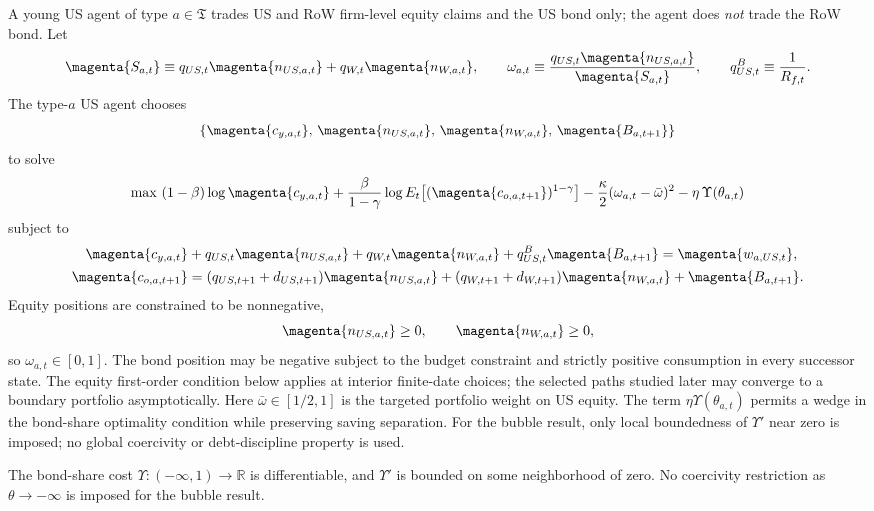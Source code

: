 \documentclass{article}
\def\green#1{#1}%
\begin{document}
A young US agent of type $a\in\mathfrak T$ trades US and RoW firm-level equity claims and the US bond only; the agent does \emph{not} trade the RoW bond. Let
\[
\magenta{S_{a,t}}\equiv q_{US,t}\magenta{n_{US,a,t}}+q_{W,t}\magenta{n_{W,a,t}},
\qquad
\omega_{a,t}\equiv\frac{q_{US,t}\magenta{n_{US,a,t}}}{\magenta{S_{a,t}}},
\qquad
q^B_{US,t}\equiv \frac{1}{R_{f,t}}.
\]
The type-$a$ US agent chooses
\[
\{\magenta{c_{y,a,t}},\,\magenta{n_{US,a,t}},\,\magenta{n_{W,a,t}},\,\magenta{B_{a,t+1}}\}
\]
to solve
\[
\max
\ (1-\beta)\log \magenta{c_{y,a,t}}
+\frac{\beta}{1-\gamma}\log E_t\!\left[(\magenta{c_{o,a,t+1}})^{1-\gamma}\right]
-\frac{\kappa}{2}(\omega_{a,t}-\bar\omega)^2
-\eta\,\Upsilon(\theta_{a,t})
\]
subject to
\begin{align*}
\magenta{c_{y,a,t}}
&+q_{US,t}\magenta{n_{US,a,t}}+q_{W,t}\magenta{n_{W,a,t}}
+q^B_{US,t}\magenta{B_{a,t+1}}
= \magenta{w_{a,US,t}},\\
\magenta{c_{o,a,t+1}}
&=
(q_{US,t+1}+d_{US,t+1})\magenta{n_{US,a,t}}
+(q_{W,t+1}+d_{W,t+1})\magenta{n_{W,a,t}}
+\magenta{B_{a,t+1}}.
\end{align*}
Equity positions are constrained to be nonnegative,
\[
\magenta{n_{US,a,t}}\ge0,
\qquad
\magenta{n_{W,a,t}}\ge0,
\]
so $\omega_{a,t}\in[0,1]$.  The bond position may be negative subject to the budget constraint and strictly positive consumption in every successor state.  The equity first-order condition below applies at interior finite-date choices; the selected paths studied later may converge to a boundary portfolio asymptotically.
Here $\bar\omega\in[1/2,1]$ is the targeted portfolio weight on US equity. The term $\eta\Upsilon(\theta_{a,t})$ \green{permits} a \green{wedge} in the \green{bond-share optimality condition while preserving} saving separation. \green{For the bubble result}, \green{only local boundedness of} $\Upsilon'$ \green{near zero is imposed}; \green{no global coercivity or debt-discipline property is used}.

\begin{ass}[Primitive \green{bond-cost regularity}]\label{ass_issuance_costs}
The \green{bond-share cost} $\Upsilon:(-\infty,1)\to\mathbb R$ is \green{differentiable}, and $\Upsilon'$ \green{is bounded on some neighborhood of zero}.  \green{No coercivity restriction as} $\theta\green{\to}-\infty$ \green{is imposed for the bubble result}.
\end{ass}
\end{document}
